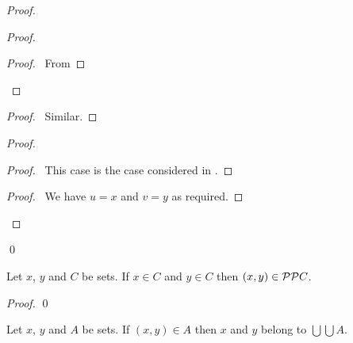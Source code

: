 \begin{proof}
    \pf
    \begin{proof}
        \begin{proof}
            \pf\ From 
        \end{proof}
    \end{proof}
    \begin{proof}
        \pf\ Similar.
    \end{proof}
    \begin{proof}
        \begin{proof}
            \pf\ This case is the case considered in .
        \end{proof}
        \begin{proof}
            \pf\ We have $u = x$ and $v = y$ as required.
        \end{proof}
    \end{proof}
    \qed
\end{proof}

\begin{lemma}
    \label{lemma:ordered_pair_pow_pow}
    Let $x$, $y$ and $C$ be sets. If $x \in C$ and $y \in C$ then $(x,y) \in \mathcal{P} \mathcal{P} C$.
\end{lemma}

\begin{proof}
    \pf
    \qed 
\end{proof}

\begin{lemma}
    \label{lemma:ordered_pair_union_union}
    Let $x$, $y$ and $A$ be sets. If $(x,y) \in A$ then $x$ and $y$ belong to $\bigcup \bigcup A$.
\end{lemma}

